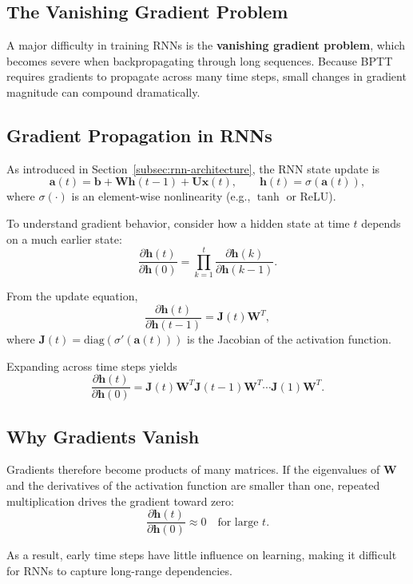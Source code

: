 \documentclass{article}
\begin{document}
\subsection{The Vanishing Gradient Problem}

A major difficulty in training RNNs is the \textbf{vanishing gradient problem}, which becomes severe when backpropagating through long sequences. Because BPTT requires gradients to propagate across many time steps, small changes in gradient magnitude can compound dramatically.

\subsection*{Gradient Propagation in RNNs}

As introduced in Section~\ref{subsec:rnn-architecture}, the RNN state update is
\[
\mathbf{a}(t)=\mathbf{b}+\mathbf{W}\mathbf{h}(t-1)+\mathbf{U}\mathbf{x}(t),
\qquad
\mathbf{h}(t)=\sigma(\mathbf{a}(t)),
\]
where \(\sigma(\cdot)\) is an element-wise nonlinearity (e.g., \(\tanh\) or ReLU).

To understand gradient behavior, consider how a hidden state at time \(t\) depends on a much earlier state:
\[
\frac{\partial \mathbf{h}(t)}{\partial \mathbf{h}(0)}
= \prod_{k=1}^{t}\frac{\partial \mathbf{h}(k)}{\partial \mathbf{h}(k-1)}.
\]

From the update equation,
\[
\frac{\partial \mathbf{h}(t)}{\partial \mathbf{h}(t-1)}
= \mathbf{J}(t)\mathbf{W}^{T},
\]
where \(\mathbf{J}(t)=\mathrm{diag}\!\left(\sigma'(\mathbf{a}(t))\right)\) is the Jacobian of the activation function.

Expanding across time steps yields
\[
\frac{\partial \mathbf{h}(t)}{\partial \mathbf{h}(0)}
= \mathbf{J}(t)\mathbf{W}^{T}
\mathbf{J}(t-1)\mathbf{W}^{T}\cdots
\mathbf{J}(1)\mathbf{W}^{T}.
\]

\subsection*{Why Gradients Vanish}

Gradients therefore become products of many matrices. If the eigenvalues of \(\mathbf{W}\) and the derivatives of the activation function are smaller than one, repeated multiplication drives the gradient toward zero:
\[
\frac{\partial \mathbf{h}(t)}{\partial \mathbf{h}(0)} \approx 0
\quad \text{for large } t.
\]

As a result, early time steps have little influence on learning, making it difficult for RNNs to capture long-range dependencies.
\end{document}
